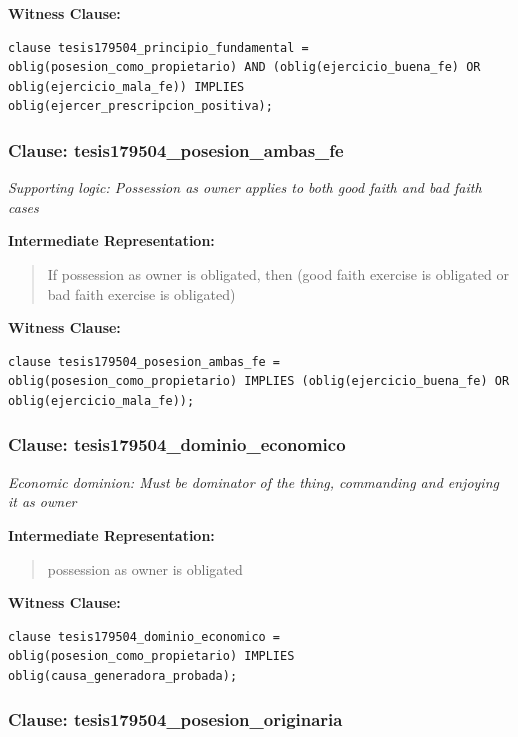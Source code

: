 \documentclass[11pt,a4paper]{article}
\begin{document}
\textbf{Witness Clause:}

\begin{lstlisting}[style=witnessstyle, language=Witness]
clause tesis179504_principio_fundamental = oblig(posesion_como_propietario) AND (oblig(ejercicio_buena_fe) OR oblig(ejercicio_mala_fe)) IMPLIES oblig(ejercer_prescripcion_positiva);
\end{lstlisting}

\subsubsection{Clause: tesis179504\_posesion\_ambas\_fe}

\textit{Supporting logic: Possession as owner applies to both good faith and bad faith cases}

\textbf{Intermediate Representation:}

\begin{quote}
If possession as owner is obligated, then (good faith exercise is obligated or bad faith exercise is obligated)
\end{quote}

\textbf{Witness Clause:}

\begin{lstlisting}[style=witnessstyle, language=Witness]
clause tesis179504_posesion_ambas_fe = oblig(posesion_como_propietario) IMPLIES (oblig(ejercicio_buena_fe) OR oblig(ejercicio_mala_fe));
\end{lstlisting}

\subsubsection{Clause: tesis179504\_dominio\_economico}

\textit{Economic dominion: Must be dominator of the thing, commanding and enjoying it as owner}

\textbf{Intermediate Representation:}

\begin{quote}
possession as owner is obligated
\end{quote}

\textbf{Witness Clause:}

\begin{lstlisting}[style=witnessstyle, language=Witness]
clause tesis179504_dominio_economico = oblig(posesion_como_propietario) IMPLIES oblig(causa_generadora_probada);
\end{lstlisting}

\subsubsection{Clause: tesis179504\_posesion\_originaria}
\end{document}
